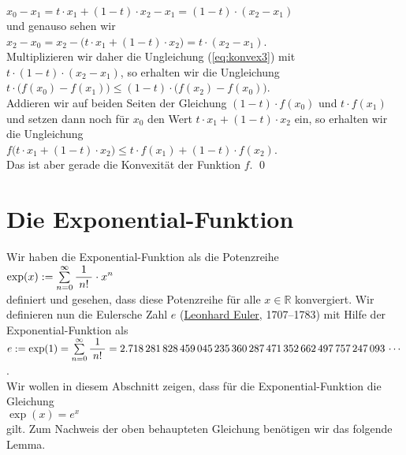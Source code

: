 \begin{enumerate}
  \hspace*{1.3cm}
  $x_0 - x_1 = t \cdot x_1 + (1 - t) \cdot x_2 - x_1 = (1-t) \cdot (x_2 - x_1)$
  \\[0.2cm]
  und genauso sehen wir
  \\[0.2cm]
  \hspace*{1.3cm}
  $x_2 - x_0 = x_2 - \bigl(t \cdot x_1 + (1 - t) \cdot x_2\bigr) = t \cdot (x_2 - x_1)$.
  \\[0.2cm]
  Multiplizieren wir daher die Ungleichung (\ref{eq:konvex3}) mit $t \cdot (1 - t) \cdot (x_2 -x_1)$, so
  erhalten wir die Ungleichung
  \\[0.2cm]
  \hspace*{1.3cm}
  $t \cdot \bigl(f(x_0) - f(x_1)\bigr) \leq (1 - t) \cdot \bigl(f(x_2) - f(x_0)\bigr)$.
  \\[0.2cm]
  Addieren wir auf beiden Seiten der Gleichung $(1 - t) \cdot f(x_0)$ und $t \cdot f(x_1)$
  und setzen dann noch f\"ur $x_0$ den Wert $t \cdot x_1 + (1-t)\cdot x_2$ ein, so erhalten wir
  die Ungleichung
  \\[0.2cm]
  \hspace*{1.3cm}
  $f\bigl(t \cdot x_1 + (1-t)\cdot x_2) \leq t \cdot f(x_1) + (1-t) \cdot f(x_2)$.
  \\[0.2cm]
  Das ist aber gerade die Konvexit\"at der Funktion $f$. \qed
\end{enumerate}
\pagebreak

\section{Die Exponential-Funktion}
Wir haben die Exponential-Funktion als die Potenzreihe
\\[0.2cm]
\hspace*{1.3cm}
$\exp(x) := \sum\limits_{n=0}^\infty \displaystyle\frac{\;\displaystyle1\;}{\;\displaystyle n!\;} \cdot x^{n}$ 
\\[0.2cm]
definiert und gesehen, dass diese Potenzreihe f\"ur alle $x \in \mathbb{R}$ konvergiert.
Wir definieren nun die Eulersche Zahl $e$ (\href{http://de.wikipedia.org/wiki/Leonhard_Euler}{Leonhard Euler},
1707--1783) mit Hilfe der Exponential-Funktion als
\\[0.2cm]
\hspace*{1.3cm}
$e := \exp(1) = \sum\limits_{n=0}^\infty \displaystyle\frac{\;\displaystyle1\;}{\;\displaystyle n!\;} = 
  2.718\,281\,828\,459\,045\,235\,360\,287\,471\,352\,662\,497\,757\,247\,093\,\cdots
$.
\\[0.2cm]
Wir wollen in diesem Abschnitt zeigen, dass f\"ur die Exponential-Funktion die Gleichung 
\\[0.2cm]
\hspace*{1.3cm}
$\exp(x) = e^x$ \quad 
\\[0.2cm]
gilt.  Zum Nachweis der oben behaupteten Gleichung ben\"otigen wir das folgende Lemma.

